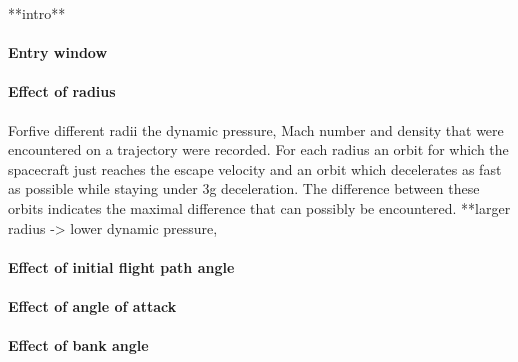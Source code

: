 **intro**

\paragraph{Entry window}

\paragraph{Effect of radius}

Forfive different radii the dynamic pressure, Mach number and density that were encountered on a trajectory were recorded. For each radius an orbit for which the spacecraft just reaches the escape velocity and an orbit which decelerates as fast as possible while staying under 3g deceleration. The difference between these orbits indicates the maximal difference that can possibly be encountered.
**larger radius -> lower dynamic pressure, 

\paragraph{Effect of initial flight path angle}

\paragraph{Effect of angle of attack}

\paragraph{Effect of bank angle}



